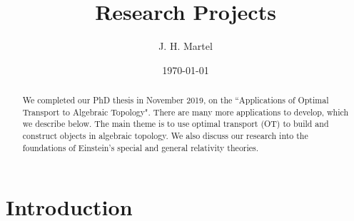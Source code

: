 \documentclass[12pt]{amsart}
\theoremstyle{remark}
\begin{document}
\title{Research Projects}


\author{J. H. Martel}
\date{\today}
\maketitle

\begin{abstract}
We completed our PhD thesis in November 2019, on the ``Applications of Optimal Transport to Algebraic Topology". There are many more applications to develop, which we describe below. The main theme is to use optimal transport (OT) to build and construct objects in algebraic topology. We also discuss our research into the foundations of Einstein's special and general relativity theories.
\end{abstract}

\tableofcontents

\section{Introduction}






\end{document}
